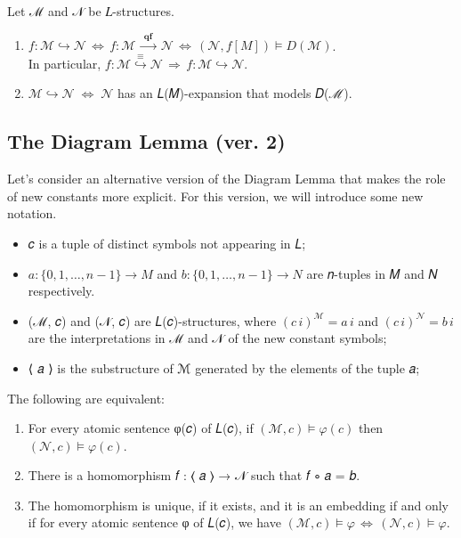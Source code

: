\documentclass[a4paper,UKenglish,cleveref,autoref,thm-restate,12pt]{lipics-v2021-wjd}
\newcommand{\<}{\langle}
\renewcommand{\>}{\rangle}
\begin{document}
\begin{lemma}
  Let ℳ and 𝒩 be 𝐿-structures.
  \begin{enumerate}
  \item
    \(𝑓 : ℳ ↪ 𝒩 \, ⇔ \, 𝑓 : ℳ \stackrel{\mathbf{qf}}{⟶} 𝒩
                  \, ⇔ \, (𝒩, 𝑓[M]) \models 𝐷(ℳ)\).\\[6pt]
    In particular, \(f : ℳ \stackrel{≡}{↪} 𝒩  \, ⇒  \, f : ℳ ↪ 𝒩\).\\[-3mm]
  \item
    \(ℳ ↪ 𝒩 \; ⇔ \; 𝒩\) has an 𝐿(𝑀)-expansion that models 𝐷(ℳ).
  \end{enumerate}
\end{lemma}

\subsection{The Diagram Lemma (ver. 2)}\label{the-diagram-lemma-ver.-2}
Let's consider an alternative version of the Diagram Lemma that makes the role
of new constants more explicit. For this version, we will introduce some 
new notation.

\begin{itemize}
\item 𝑐 is a tuple of distinct symbols not appearing in 𝐿;
\item \(𝑎 : \{0, 1, …, 𝑛-1\} → 𝑀\) and \(𝑏 : \{0, 1, …, 𝑛-1\} → 𝑁\) are 𝑛-tuples in 𝑀 and 𝑁 respectively.
\item (ℳ, 𝑐) and (𝒩, 𝑐) are 𝐿(𝑐)-structures, where \((𝑐 \,i)^ℳ = 𝑎 \, i\) and
  \((𝑐\, i)^𝒩 = 𝑏\, i\) are the interpretations in ℳ and 𝒩 of the new constant
  symbols;
\item
  ⟨ 𝑎 ⟩ is the substructure of ℳ generated by the elements of the tuple 𝑎;
\end{itemize}

\begin{lemma} The following are equivalent:
  \begin{enumerate}
  \item For every atomic sentence φ(𝑐) of 𝐿(𝑐), if \((ℳ, 𝑐) \models φ(𝑐)\) then \((𝒩, 𝑐)\models φ(𝑐)\). 
  \item There is a homomorphism 𝑓 : ⟨ 𝑎 ⟩ → 𝒩 such that 𝑓 ∘ 𝑎 = 𝑏.
  \item The homomorphism is unique, if it exists, and it is an embedding if and
    only if for every atomic sentence φ of 𝐿(𝑐), we have
    \((ℳ, 𝑐) \models φ \, ⇔ \, (𝒩, 𝑐) \models φ\).
  \end{enumerate}
\end{lemma}
\end{document}
